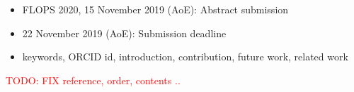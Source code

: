 \documentclass[runningheads]{llncs}
\begin{document}
\begin{itemize}
\item FLOPS 2020, 15 November 2019 (AoE): Abstract submission
\item 22 November 2019 (AoE): Submission deadline
\item keywords, ORCID id, introduction, contribution, future work, related work 
\end{itemize}




\newpage


















\textcolor{red}{TODO: FIX reference, order, contents ..}
\end{document}
